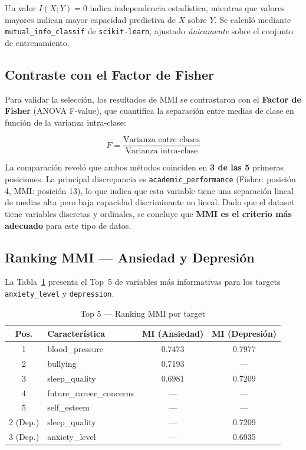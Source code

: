 \documentclass[12pt, letterpaper]{article}
\begin{document}
Un valor $I(X;Y) = 0$ indica independencia estadística, mientras que
valores mayores indican mayor capacidad predictiva de $X$ sobre $Y$. Se
calculó mediante \texttt{mutual\_info\_classif} de \texttt{scikit-learn},
ajustado \emph{únicamente} sobre el conjunto de entrenamiento.

\subsection{Contraste con el Factor de Fisher}

Para validar la selección, los resultados de MMI se contrastaron con el
\textbf{Factor de Fisher} (ANOVA F-value), que cuantifica la separación
entre medias de clase en función de la varianza intra-clase:

\begin{equation}
    F = \frac{\text{Varianza entre clases}}{\text{Varianza intra-clase}}
\end{equation}

La comparación reveló que ambos métodos coinciden en \textbf{3 de las 5}
primeras posiciones. La principal discrepancia es \texttt{academic\_performance}
(Fisher: posición 4, MMI: posición 13), lo que indica que esta variable
tiene una separación lineal de medias alta pero baja capacidad discriminante
no lineal. Dado que el dataset tiene variables discretas y ordinales, se
concluye que \textbf{MMI es el criterio más adecuado} para este tipo de
datos.

\subsection{Ranking MMI — Ansiedad y Depresión}

La Tabla~\ref{tab:ranking_mmi} presenta el Top~5 de variables más
informativas para los targets \texttt{anxiety\_level} y \texttt{depression}.

\begin{table}[H]
    \centering
    \caption{Top 5 — Ranking MMI por target}
    \label{tab:ranking_mmi}
    \begin{tabular}{clcc}
        \toprule
        \textbf{Pos.} & \textbf{Característica} &
        \textbf{MI (Ansiedad)} & \textbf{MI (Depresión)} \\
        \midrule
        \rowcolor{rowgray}
        1 & blood\_pressure               & 0.7473 & 0.7977 \\
        2 & bullying                      & 0.7193 & --- \\
        \rowcolor{rowgray}
        3 & sleep\_quality                & 0.6981 & 0.7209 \\
        4 & future\_career\_concerns      & --- & --- \\
        \rowcolor{rowgray}
        5 & self\_esteem                  & --- & --- \\
        \midrule
        2 (Dep.) & sleep\_quality         & --- & 0.7209 \\
        \rowcolor{rowgray}
        3 (Dep.) & anxiety\_level         & --- & 0.6935 \\
        \bottomrule
    \end{tabular}
\end{table}
\end{document}
